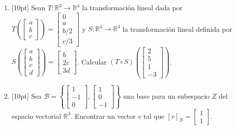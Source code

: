 \documentclass[11pt]{article}
\newcommand{\vf}{\fbox{V}\ \fbox{F}}
\begin{document}
\begin{enumerate}
\vspace{4pt}
\vf

\vspace{6pt}
\noindent (e) [2pt] El conjunto de todos los vectores $\begin{bmatrix}x\\y\end{bmatrix}$ en $\mathbb{R}^2$ con $y\geq 0$ es un sub-espacio vectorial.

\vspace{4pt}
\vf

\item{}[10pt] Sean $T:\mathbb{R}^3\to\mathbb{R}^4$ la transformación lineal dada por $T\left(\begin{bmatrix}a\\b\\c\end{bmatrix}\right)=\begin{bmatrix}0\\a\\b/2\\c/3\end{bmatrix}$ y $S:\mathbb{R}^4\to\mathbb{R}^3$ la transformación lineal definida por $S\left(\begin{bmatrix}a\\b\\c\\d\end{bmatrix}\right)=\begin{bmatrix}b\\2c\\3d\end{bmatrix}$. Calcular $(T\circ S)\left(\begin{bmatrix}2\\5\\1\\-3\end{bmatrix}\right)$.

\vspace{4pt}

\item{}[10pt] Sea $\mathcal{B}=\left\{\begin{bmatrix}1\\-1\\0\end{bmatrix},\begin{bmatrix}1\\0\\-1\end{bmatrix}\right\}$ una base para un subespacio $Z$ del espacio vectorial $\mathbb{R}^3$. Encontrar un vector $v$ tal que $[v]_{\mathcal{B}}=\begin{bmatrix}1\\1\end{bmatrix}$.


\end{enumerate}
\end{document}
